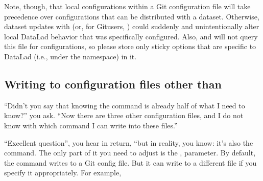 \sphinxAtStartPar
Note, though, that local configurations within a Git configuration file
will take precedence over configurations that can be distributed with a dataset.
Otherwise, dataset updates with  (or, for Git\sphinxhyphen{}users,
) could suddenly and unintentionally alter local DataLad
behavior that was specifically configured.
Also, {\hyperref[\detokenize{glossary:term-Git}]{}} and {\hyperref[\detokenize{glossary:term-git-annex}]{}} will not query this file for configurations, so please store only sticky options that are specific to DataLad (i.e., under the  namespace) in it.

\ignorespaces 

\subsection{Writing to configuration files other than }
\label{\detokenize{basics/101-123-config2:writing-to-configuration-files-other-than-git-config}}\label{\detokenize{basics/101-123-config2:index-3}}
\sphinxAtStartPar
“Didn’t you say that knowing the  command is already
half of what I need to know?” you ask. “Now there are three other configuration
files, and I do not know with which command I can write into these files.”

\sphinxAtStartPar
“Excellent question”, you hear in return, “but in reality, you  know:
it’s also the  command. The only part of it you need to
adjust is the ,  parameter. By default, the command writes to
a Git config file. But it can write to a different file if you specify it
appropriately. For example,
\begin{quote}

\sphinxAtStartPar
{}
\end{quote}

